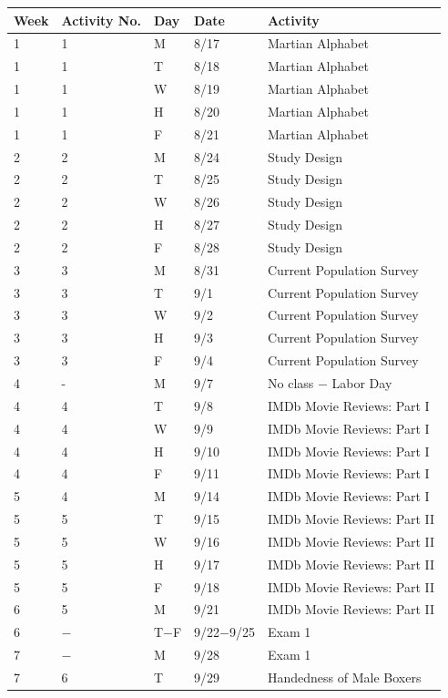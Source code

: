 \documentclass[
]{report}
\begin{document}
\begin{longtable}{|p{}|l|p{}|l|p{}|}
\hline
\textbf{Week}& \textbf{Activity No.}& \textbf{Day}& \textbf{Date}& \textbf{Activity} \\ \hline
\endhead
1& 1& M& 8/17& Martian Alphabet \\*
1& 1& T& 8/18& Martian Alphabet \\*
1& 1& W& 8/19& Martian Alphabet \\*
1& 1& H& 8/20& Martian Alphabet \\*
1& 1& F& 8/21& Martian Alphabet \\ \hline
2& 2& M& 8/24& Study Design \\*
2& 2& T& 8/25& Study Design \\*
2& 2& W& 8/26& Study Design \\*
2& 2& H& 8/27& Study Design \\*
2& 2& F& 8/28& Study Design \\ \hline
3& 3& M& 8/31& Current Population Survey \\*
3& 3& T& 9/1& Current Population Survey \\*
3& 3& W& 9/2& Current Population Survey \\*
3& 3& H& 9/3& Current Population Survey \\*
3& 3& F& 9/4& Current Population Survey \\ \hline
4& -& M& 9/7&	No class $-$ Labor Day \\*
4& 4& T& 9/8& IMDb Movie Reviews: Part I \\*
4& 4& W& 9/9& IMDb Movie Reviews: Part I \\*
4& 4& H& 9/10& IMDb Movie Reviews: Part I \\*
4& 4& F& 9/11& IMDb Movie Reviews: Part I \\ \hline
5& 4& M& 9/14& IMDb Movie Reviews: Part I \\*
5& 5& T& 9/15& IMDb Movie Reviews: Part II \\*
5& 5& W& 9/16& IMDb Movie Reviews: Part II \\*	
5& 5& H& 9/17& IMDb Movie Reviews: Part II \\*
5& 5& F& 9/18& IMDb Movie Reviews: Part II \\ \hline
6& 5& M& 9/21& IMDb Movie Reviews: Part II \\*
6& $-$& T$-$F& 9/22$-$9/25& Exam 1 \\ \hline
7& $-$& M& 9/28& Exam 1 \\*
7& 6& T& 9/29& Handedness of Male Boxers \\*

\end{longtable}
\end{document}
